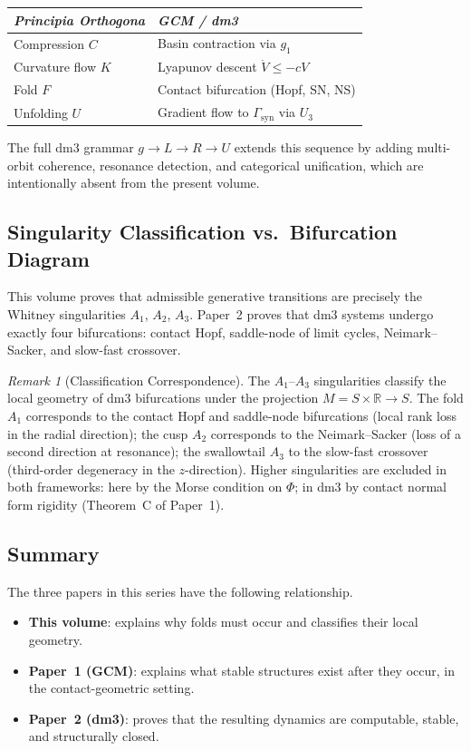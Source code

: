 \documentclass[12pt, oneside]{book}
\theoremstyle{plain}
\theoremstyle{definition}
\theoremstyle{remark}
\newtheorem{remark}{Remark}[section]
\begin{document}
\begin{center}
\begin{tabular}{ll}
\toprule
\emph{Principia Orthogona} & \emph{GCM / dm3} \\
\midrule
Compression $C$ & Basin contraction via $g_1$ \\
Curvature flow $K$ & Lyapunov descent $\dot{V} \le -cV$ \\
Fold $F$ & Contact bifurcation (Hopf, SN, NS) \\
Unfolding $U$ & Gradient flow to $\Gamma_{\mathrm{syn}}$ via $U_3$ \\
\bottomrule
\end{tabular}
\end{center}

The full dm3 grammar $g \to L \to R \to U$ extends this sequence
by adding multi-orbit coherence, resonance detection, and categorical
unification, which are intentionally absent from the present volume.

\subsection{Singularity Classification vs.\ Bifurcation Diagram}

This volume proves that admissible generative transitions are
precisely the Whitney singularities $A_1$, $A_2$, $A_3$.
Paper~2 proves that dm3 systems undergo exactly four bifurcations:
contact Hopf, saddle-node of limit cycles, Neimark--Sacker, and
slow-fast crossover.

\begin{remark}[Classification Correspondence]
The $A_1$--$A_3$ singularities classify the local geometry of dm3
bifurcations under the projection $M = S \times \mathbb{R} \to S$.
The fold $A_1$ corresponds to the contact Hopf and saddle-node
bifurcations (local rank loss in the radial direction); the cusp
$A_2$ corresponds to the Neimark--Sacker (loss of a second
direction at resonance); the swallowtail $A_3$ to the slow-fast
crossover (third-order degeneracy in the $z$-direction). Higher
singularities are excluded in both frameworks: here by the Morse
condition on $\Phi$; in dm3 by contact normal form rigidity
(Theorem~C of Paper~1).
\end{remark}

\subsection{Summary}

The three papers in this series have the following relationship.
\begin{itemize}[leftmargin=*]
  \item \textbf{This volume}: explains why folds must occur and
        classifies their local geometry.
  \item \textbf{Paper~1 (GCM)}: explains what stable structures
        exist after they occur, in the contact-geometric setting.
  \item \textbf{Paper~2 (dm3)}: proves that the resulting dynamics
        are computable, stable, and structurally closed.
\end{itemize}
\end{document}
